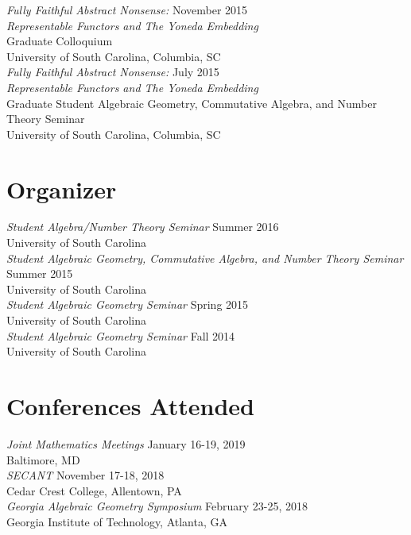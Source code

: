 \documentclass{article}
\begin{document}
  \noindent\textsl{Fully Faithful Abstract Nonsense:} \hfill November 2015\\
  \textsl{Representable Functors and The Yoneda Embedding}\\
  Graduate Colloquium\\
  University of South Carolina, Columbia, SC\\

  \noindent\textsl{Fully Faithful Abstract Nonsense:} \hfill July 2015\\
  \textsl{Representable Functors and The Yoneda Embedding}\\
  Graduate Student Algebraic Geometry, Commutative Algebra, and Number Theory Seminar\\
  University of South Carolina, Columbia, SC

  \section*{Organizer}
  \textsl{Student Algebra/Number Theory Seminar} \hfill Summer 2016\\
  University of South Carolina\\
  
  \noindent\textsl{Student Algebraic Geometry, Commutative Algebra, and Number Theory Seminar} \hfill Summer 2015\\
  University of South Carolina\\
  
  \noindent\textsl{Student Algebraic Geometry Seminar} \hfill Spring 2015\\
  University of South Carolina\\

  \noindent\textsl{Student Algebraic Geometry Seminar} \hfill Fall 2014\\
  University of South Carolina
  
  \section*{Conferences Attended}
  \textsl{Joint Mathematics Meetings} \hfill January 16-19, 2019\\
  Baltimore, MD\\
  
  \noindent\textsl{SECANT} \hfill November 17-18, 2018\\
  Cedar Crest College, Allentown, PA\\
  
  \noindent\textsl{Georgia Algebraic Geometry Symposium} \hfill February 23-25, 2018\\
  Georgia Institute of Technology, Atlanta, GA\\
  
\end{document}
